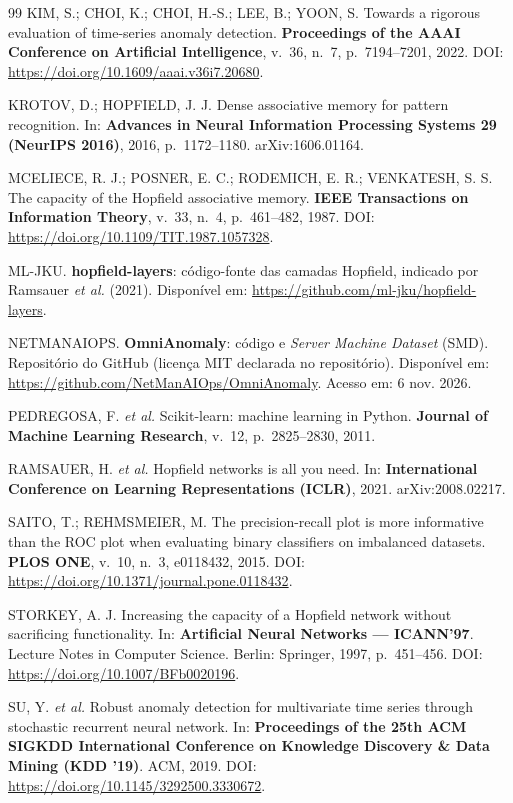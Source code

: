 \begin{thebibliography}{99}
 KIM, S.; CHOI, K.; CHOI, H.-S.; LEE, B.; YOON, S. Towards a rigorous evaluation of
time-series anomaly detection. \textbf{Proceedings of the AAAI Conference on Artificial Intelligence},
v.~36, n.~7, p.~7194--7201, 2022. DOI: \url{https://doi.org/10.1609/aaai.v36i7.20680}.

 KROTOV, D.; HOPFIELD, J. J. Dense associative memory for pattern recognition. In:
\textbf{Advances in Neural Information Processing Systems 29 (NeurIPS 2016)}, 2016, p.~1172--1180.
arXiv:1606.01164.

 MCELIECE, R. J.; POSNER, E. C.; RODEMICH, E. R.; VENKATESH, S. S. The capacity of the
Hopfield associative memory. \textbf{IEEE Transactions on Information Theory}, v.~33, n.~4, p.~461--482,
1987. DOI: \url{https://doi.org/10.1109/TIT.1987.1057328}.

 ML-JKU. \textbf{hopfield-layers}: código-fonte das camadas Hopfield, indicado por
Ramsauer \textit{et al.} (2021). Disponível em: \url{https://github.com/ml-jku/hopfield-layers}.

 NETMANAIOPS. \textbf{OmniAnomaly}: código e \textit{Server Machine Dataset} (SMD).
Repositório do GitHub (licença MIT declarada no repositório). Disponível em:
\url{https://github.com/NetManAIOps/OmniAnomaly}. Acesso em: 6 nov. 2026.

 PEDREGOSA, F. \textit{et al.} Scikit-learn: machine learning in Python.
\textbf{Journal of Machine Learning Research}, v.~12, p.~2825--2830, 2011.

 RAMSAUER, H. \textit{et al.} Hopfield networks is all you need. In:
\textbf{International Conference on Learning Representations (ICLR)}, 2021. arXiv:2008.02217.

 SAITO, T.; REHMSMEIER, M. The precision-recall plot is more informative than the ROC plot
when evaluating binary classifiers on imbalanced datasets. \textbf{PLOS ONE}, v.~10, n.~3, e0118432, 2015.
DOI: \url{https://doi.org/10.1371/journal.pone.0118432}.

 STORKEY, A. J. Increasing the capacity of a Hopfield network without sacrificing
functionality. In: \textbf{Artificial Neural Networks --- ICANN'97}. Lecture Notes in Computer Science.
Berlin: Springer, 1997, p.~451--456. DOI: \url{https://doi.org/10.1007/BFb0020196}.

 SU, Y. \textit{et al.} Robust anomaly detection for multivariate time series through
stochastic recurrent neural network. In: \textbf{Proceedings of the 25th ACM SIGKDD International Conference
on Knowledge Discovery \& Data Mining (KDD '19)}. ACM, 2019.
DOI: \url{https://doi.org/10.1145/3292500.3330672}.


\end{thebibliography}
